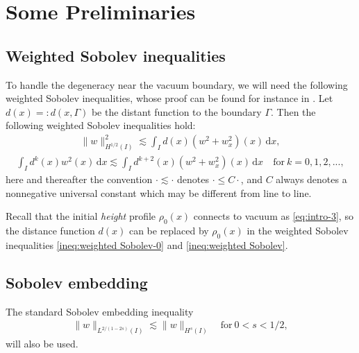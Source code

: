 \documentclass[11pt, reqno]{amsart}
\newcommand{\diff}{\mathrm{d}}
\numberwithin{equation}{section}
\begin{document}
\section{Some Preliminaries}\label{Some Preliminaries}

\subsection{Weighted Sobolev inequalities}
To handle the degeneracy near the vacuum boundary, we will need the following weighted Sobolev inequalities, whose proof can be found for instance in \cite{MR0802206}. Let \(d(x)=\colon d(x,\Gamma)\) be the distant function to the boundary \(\Gamma\). Then the following weighted Sobolev inequalities hold:
\begin{equation}\label{ineq:weighted Sobolev-0}
\begin{aligned}
\|w\|_{H^{1/2}(I)}^2\lesssim \int_Id(x)(w^2+w_x^2)(x)\,\diff x,
\end{aligned}
\end{equation}
\begin{equation}\label{ineq:weighted Sobolev}
\begin{aligned}
\int_Id^k(x)w^2(x)\,\diff x\lesssim \int_Id^{k+2}(x)(w^2+w_x^2)(x)\,\diff x\quad \mbox{for}\ k=0,1,2,...,
\end{aligned}
\end{equation}
here and thereafter the convention \(\cdot\lesssim\cdot\) denotes \(\cdot\leq C\cdot \), and \(C\) always denotes a nonnegative universal constant which may be different from line to line.

Recall that the initial \emph{height} profile \(\rho_0(x)\) connects to vacuum as \eqref{eq:intro-3}, so the distance function \(d(x)\) can be replaced by \(\rho_0(x)\) in the weighted Sobolev inequalities \eqref{ineq:weighted Sobolev-0} and \eqref{ineq:weighted Sobolev}.

\subsection{Sobolev embedding}
The standard Sobolev embedding inequality
\begin{equation}\label{Sobolev inequaty}
\begin{aligned}
\|w\|_{L^{2/(1-2s)}(I)}\lesssim \|w\|_{H^s(I)}\quad \mbox{for}\ 0<s<1/2,
\end{aligned}
\end{equation}
will also be used.
\end{document}
